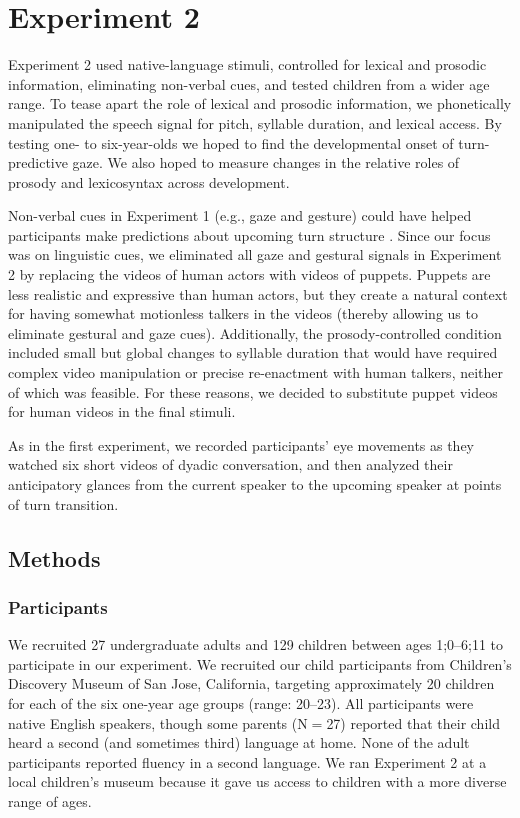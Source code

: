 \documentclass[authoryear, 12pt]{elsarticle}
\begin{document}

%


\section{Experiment 2}
\label{sec:exp2}

Experiment 2 used native-language stimuli, controlled for lexical and prosodic information, eliminating non-verbal cues, and tested children from a wider age range. To tease apart the role of lexical and prosodic information, we phonetically manipulated the speech signal for pitch, syllable duration, and lexical access. By testing one- to six-year-olds we hoped to find the developmental onset of turn-predictive gaze. We also hoped to measure changes in the relative roles of prosody and lexicosyntax across development.

Non-verbal cues in Experiment 1 (e.g., gaze and gesture) could have helped participants make predictions about upcoming turn structure  \citep{rossano2009, stivers2010}. Since our focus was on linguistic cues, we eliminated all gaze and gestural signals in Experiment 2 by replacing the videos of human actors with videos of puppets. Puppets are less realistic and expressive than human actors, but they create a natural context for having somewhat motionless talkers in the videos (thereby allowing us to eliminate gestural and gaze cues). Additionally, the prosody-controlled condition included small but global changes to syllable duration that would have required complex video manipulation or precise re-enactment with human talkers, neither of which was feasible. For these reasons, we decided to substitute puppet videos for human videos in the final stimuli. 

As in the first experiment, we recorded participants' eye movements as they watched six short videos of dyadic conversation, and then analyzed their anticipatory glances from the current speaker to the upcoming speaker at points of turn transition.

\subsection{Methods}
\label{sec:methods2}

\subsubsection{Participants}
We recruited 27 undergraduate adults and 129 children between ages 1;0--6;11 to participate in our experiment. We recruited our child participants from Children's Discovery Museum of San Jose, California, targeting approximately 20 children for each of the six one-year age groups (range: 20--23). All participants were native English speakers, though some parents (N$=$27) reported that their child heard a second (and sometimes third) language at home. None of the adult participants reported fluency in a second language. We ran Experiment 2 at a local children's museum because it gave us access to children with a more diverse range of ages.
\end{document}
